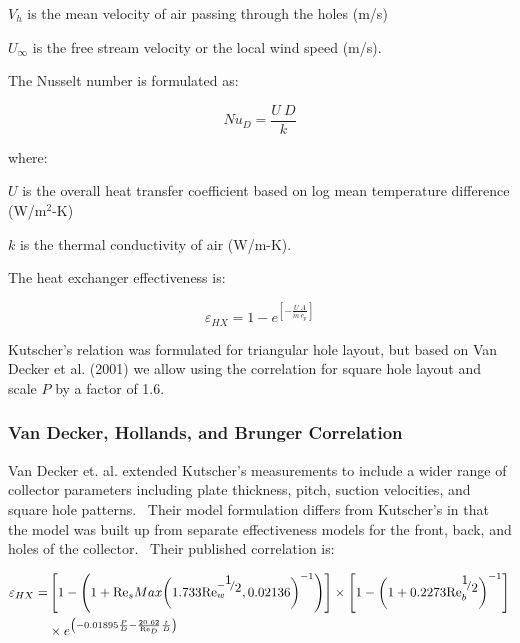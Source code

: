 \({V_h}\) is the mean velocity of air passing through the holes (m/s)

\({U_\infty }\) is the free stream velocity or the local wind speed (m/s).

The Nusselt number is formulated as:

\begin{equation}
N{u_D} = \frac{{U~D}}{k}
\end{equation}

where:

\(U\) is the overall heat transfer coefficient based on log mean temperature difference (W/m\(^{2}\)-K)

\(k\) is the thermal conductivity of air (W/m-K).

The heat exchanger effectiveness is:

\begin{equation}
{\varepsilon_{HX}} = 1 - {e^{\left[ { - \frac{{U~A}}{{\dot m~{c_p}}}} \right]}}
\end{equation}

Kutscher's relation was formulated for triangular hole layout, but based on Van Decker et al. (2001) we allow using the correlation for square hole layout and scale \(P\) by a factor of 1.6.

\subsubsection{Van Decker, Hollands, and Brunger Correlation}\label{van-decker-hollands-and-brunger-correlation}

Van Decker et. al. extended Kutscher's measurements to include a wider range of collector parameters including plate thickness, pitch, suction velocities, and square hole patterns.~ Their model formulation differs from Kutscher's in that the model was built up from separate effectiveness models for the front, back, and holes of the collector.~ Their published correlation is:

\begin{equation}
\begin{split}
{\varepsilon_{HX}} =& \left[ {1 - \left( {1 + {{{\mathop{\rm Re}\nolimits} }_s}Max{{\left( {1.733{\mathop{\rm Re}\nolimits}_w^{ - {\raise0.7ex\hbox{1} \!\mathord{\left/ {\vphantom {1 2}}\right.}\!\lower0.7ex\hbox{2}}},0.02136} \right)}^{ - 1}}} \right)} \right] \times \left[ {1 - {{\left( {1 + 0.2273{\mathop{\rm Re}\nolimits}_b^{{\raise0.7ex\hbox{1} \!\mathord{\left/ {\vphantom {1 2}}\right.}\!\lower0.7ex\hbox{2}}}} \right)}^{ - 1}}} \right] \\
&\times {e^{\left( { - 0.01895\frac{P}{D} - \frac{{20.62}}{{{{{\mathop{\rm Re}\nolimits} }_D}}}\frac{t}{D}} \right)}}
\end{split}
\end{equation}

